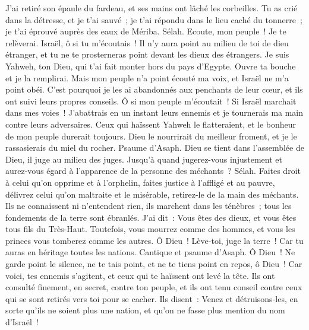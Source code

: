 \begin{multicols}{2}
J'ai retiré son épaule du fardeau, et ses mains ont lâché les corbeilles.
Tu as crié dans la détresse, et je t'ai sauvé~; je t'ai répondu dans le lieu caché du tonnerre~; je t'ai éprouvé auprès des eaux de Mériba. Sélah.
Ecoute, mon peuple~! Je te relèverai. Israël, ô si tu m'écoutais~!
 Il n'y aura point au milieu de toi de dieu étranger, et tu ne te prosterneras point devant les dieux des étrangers.
Je suis Yahweh, ton Dieu, qui t'ai fait monter hors du pays d'Egypte. Ouvre ta bouche et je la remplirai.
Mais mon peuple n'a point écouté ma voix, et Israël ne m'a point obéi.
C'est pourquoi je les ai abandonnés aux penchants de leur cœur, et ils ont suivi leurs propres conseils.
Ô si mon peuple m'écoutait~! Si Israël marchait dans mes voies~!
J'abattrais en un instant leurs ennemis et je tournerais ma main contre leurs adversaires.
Ceux qui haïssent Yahweh le flatteraient, et le bonheur de mon peuple durerait toujours.
Dieu le nourrirait du meilleur froment, et je le rassasierais du miel du rocher.
\VerseOne{}Psaume d'Asaph. Dieu se tient dans l'assemblée de Dieu, il juge au milieu des juges.
Jusqu'à quand jugerez-vous injustement et aurez-vous égard à l'apparence de la personne des méchants~? Sélah.
Faites droit à celui qu'on opprime et à l'orphelin, faites justice à l'affligé et au pauvre,
délivrez celui qu'on maltraite et le misérable, retirez-le de la main des méchants.
Ils ne connaissent ni n'entendent rien, ils marchent dans les ténèbres~; tous les fondements de la terre sont ébranlés.
J'ai dit~: Vous êtes des dieux, et vous êtes tous fils du Très-Haut.
Toutefois, vous mourrez comme des hommes, et vous les princes vous tomberez comme les autres.
Ô Dieu~! Lève-toi, juge la terre~! Car tu auras en héritage toutes les nations.
\VerseOne{}Cantique et psaume d'Asaph.
Ô Dieu~! Ne garde point le silence, ne te tais point, et ne te tiens point en repos, ô Dieu~!
Car voici, tes ennemis s'agitent, et ceux qui te haïssent ont levé la tête.
Ils ont consulté finement, en secret, contre ton peuple, et ils ont tenu conseil contre ceux qui se sont retirés vers toi pour se cacher.
Ils disent~: Venez et détruisons-les, en sorte qu'ils ne soient plus une nation, et qu'on ne fasse plus mention du nom d'Israël~!

\end{multicols}
